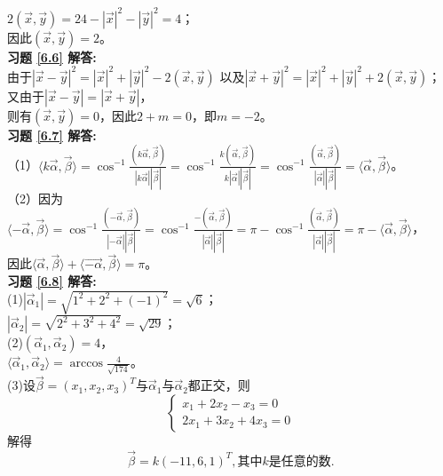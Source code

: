 $2(\vec{x},\vec{y})=24-|\vec{x}|^2-|\vec{y}|^2=4$；\\
因此$(\vec{x},\vec{y})=2$。\\
\textbf{习题 \ref{6.6} 解答:}\\
由于$|\vec{x}-\vec{y}|^2=|\vec{x}|^2+|\vec{y}|^2-2(\vec{x},\vec{y})$ 以及$|\vec{x}+\vec{y}|^2=|\vec{x}|^2+|\vec{y}|^2+2(\vec{x},\vec{y})$；\\
又由于$|\vec{x}-\vec{y}|=|\vec{x}+\vec{y}|$，\\
则有$(\vec{x},\vec{y})=0$，因此$2+m=0$，即$m=-2$。\\
\textbf{习题 \ref{6.7} 解答:}\\
（1）$\langle k\vec{\alpha},\vec{\beta}\rangle=\cos^{-1}\frac{(k\vec{\alpha},\vec{\beta})}{|k\vec{\alpha}||\vec{\beta}|}
   =\cos^{-1}\frac{k(\vec{\alpha},\vec{\beta})}{k|\vec{\alpha}||\vec{\beta}|}
   =\cos^{-1}\frac{(\vec{\alpha},\vec{\beta})}{|\vec{\alpha}||\vec{\beta}|}
   =\langle\vec{\alpha},\vec{\beta}\rangle$。\\
（2）因为$\langle -\vec{\alpha},\vec{\beta}\rangle=\cos^{-1}\frac{(-\vec{\alpha},\vec{\beta})}{|-\vec{\alpha}||\vec{\beta}|}
   =\cos^{-1}\frac{-(\vec{\alpha},\vec{\beta})}{|\vec{\alpha}||\vec{\beta}|}
   =\pi-\cos^{-1}\frac{(\vec{\alpha},\vec{\beta})}{|\vec{\alpha}||\vec{\beta}|}
   =\pi-\langle\vec{\alpha},\vec{\beta}\rangle$，\\
   因此$\langle\vec{\alpha},\vec{\beta}\rangle+\langle\vec{-\alpha},\vec{\beta}\rangle=\pi$。\\
\textbf{习题 \ref{6.8} 解答:}\\
(1)$|\vec{\alpha}_1|=\sqrt{1^2+2^2+(-1)^2}=\sqrt{6}$；\\
$|\vec{\alpha}_2|=\sqrt{2^2+3^2+4^2}=\sqrt{29}$；\\
(2)$(\vec{\alpha}_1,\vec{\alpha}_2)=4$，\\
$\langle\vec{\alpha}_1,\vec{\alpha}_2\rangle=\arccos\frac{4}{\sqrt{174}}$。\\
(3)设$\vec{\beta}=(x_1,x_2,x_3)^T$与$\vec{\alpha}_1$与$\vec{\alpha}_2$都正交，则
\begin{equation*}
  \begin{cases}
  x_1+2x_2-x_3=0\\
  2x_1+3x_2+4x_3=0
  \end{cases}
\end{equation*}
解得
\begin{equation*}
\vec{\beta}=k(-11,6,1)^T,\text{其中}k\text{是任意的数}.
\end{equation*}\\
